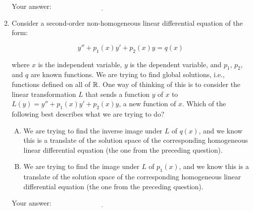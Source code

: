 \documentclass[10pt]{amsart}
\begin{document}
\begin{enumerate}
  \vspace{0.1in}
  Your answer: $\underline{\qquad\qquad\qquad\qquad\qquad\qquad\qquad}$
  \vspace{0.1in}

\item Consider a second-order non-homogeneous linear differential
  equation of the form:

  $$y'' + p_1(x)y' + p_2(x)y = q(x)$$

  where $x$ is the independent variable, $y$ is the dependent
  variable, and $p_1$, $p_2$, and $q$ are known functions. We are
  trying to find global solutions, i.e., functions defined on all of
  $\mathbb{R}$. One way of thinking of this is to consider the linear
  transformation $L$ that sends a function $y$ of $x$ to $L(y) = y'' +
  p_1(x)y' + p_2(x)y$, a new function of $x$. Which of the following
  best describes what we are trying to do?

  \begin{enumerate}[(A)]
  \item We are trying to find the inverse image under $L$ of $q(x)$,
    and we know this is a translate of the solution space of the
    corresponding homogeneous linear differential equation (the one
    from the preceding question).
  \item We are trying to find the image under $L$ of $p_1(x)$,
    and we know this is a translate of the solution space of the
    corresponding homogeneous linear differential equation (the one
    from the preceding question).
  \end{enumerate}

  \vspace{0.1in}
  Your answer: $\underline{\qquad\qquad\qquad\qquad\qquad\qquad\qquad}$
  \vspace{0.1in}

\end{enumerate}
\end{document}
